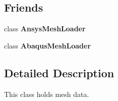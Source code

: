 \subsection*{Friends}
\begin{DoxyCompactItemize}
\item 
\hypertarget{classmesh_1_1_mesh_a5da36615b6c00ca1941e7504222978be}{
class {\bfseries AnsysMeshLoader}}
\label{classmesh_1_1_mesh_a5da36615b6c00ca1941e7504222978be}

\item 
\hypertarget{classmesh_1_1_mesh_a7b065f6fb884c97bbb9100e204979c70}{
class {\bfseries AbaqusMeshLoader}}
\label{classmesh_1_1_mesh_a7b065f6fb884c97bbb9100e204979c70}

\end{DoxyCompactItemize}


\subsection{Detailed Description}
This class holds mesh data. 

